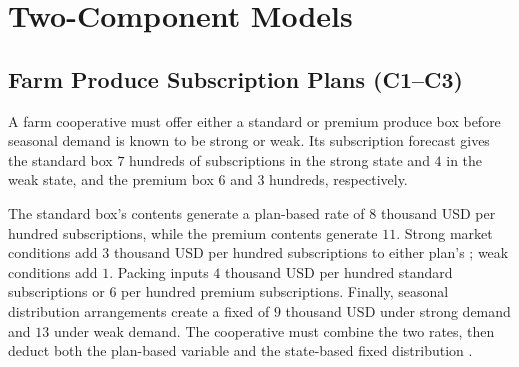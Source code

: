 
	\section{Two-Component Models}
	\label{sec:two-component-models}


	\subsection{Farm Produce Subscription Plans (C1--C3)}
	\label{sec:problem9-farm-produce-subscription-c1-c3}

	A farm cooperative must offer either a standard or premium produce box before seasonal demand is known to be strong or weak. Its subscription forecast gives the standard box \(7\) hundreds of subscriptions in the strong state and \(4\) in the weak state, and the premium box \(6\) and \(3\) hundreds, respectively.

	The standard box's contents generate a plan-based  rate of \(8\) thousand USD per hundred subscriptions, while the premium contents generate \(11\). Strong market conditions add \(3\) thousand USD per hundred subscriptions to either plan's ; weak conditions add \(1\). Packing inputs  \(4\) thousand USD per hundred standard subscriptions or \(6\) per hundred premium subscriptions. Finally, seasonal distribution arrangements create a fixed  of \(9\) thousand USD under strong demand and \(13\) under weak demand. The cooperative must combine the two  rates, then deduct both the plan-based variable  and the state-based fixed distribution .

